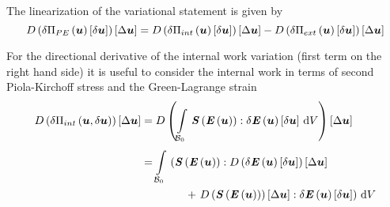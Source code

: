 The linearization of the variational statement is given by 
\begin{equation}
  \directionalderiv{}{\variation{\fnof{\Pi_{PE}}{\vectr{u}}}{\vectr{u}}}{\linearisationdir{\vectr{u}}}=
  \directionalderiv{}{\variation{\fnof{\Pi_{int}}{\vectr{u}}}{\vectr{u}}}{\linearisationdir{\vectr{u}}}
  -\directionalderiv{}{\variation{\fnof{\Pi_{ext}}{\vectr{u}}}{\vectr{u}}}{\linearisationdir{\vectr{u}}}
\end{equation}

For the directional derivative of the internal work variation (first term on
the right hand side) it is useful to consider the internal work in terms of
second Piola-Kirchoff stress and the Green-Lagrange strain \ie
\begin{equation}
  \begin{split}
    \directionalderiv{}{\delta\fnof{\Pi_{int}}{\vectr{u},\delta\vectr{u}}}{\linearisationdir{\vectr{u}}}
    &=\directionalderiv{}{\gint{\embedmanifold{B}_{0}}{}{\doubledotprod{\fnof{\tensor{S}}{
            \fnof{\tensor{E}}{\vectr{u}}}}{\variation{\fnof{\tensor{E}}{\vectr{u}}}{\vectr{u}}}}{V}}{\linearisationdir{\vectr{u}}}\\ &=\gint{\embedmanifold{B}_{0}}{}{\left(\doubledotprod{\fnof{\tensor{S}}{
          \fnof{\tensor{E}}{\vectr{u}}}}{\directionalderiv{}{\variation{\fnof{\tensor{E}}{\vectr{u}}}{\vectr{u}}}{\linearisationdir{\vectr{u}}}}\right.\\ &\qquad
      \qquad + \left.\doubledotprod{\directionalderiv{}{\fnof{\tensor{S}}{
            \fnof{\tensor{E}}{\vectr{u}}}}{\linearisationdir{\vectr{u}}}}{\variation{\fnof{\tensor{E}}{\vectr{u}}}{\vectr{u}}}\right)}{V}
  \end{split}
\end{equation}

